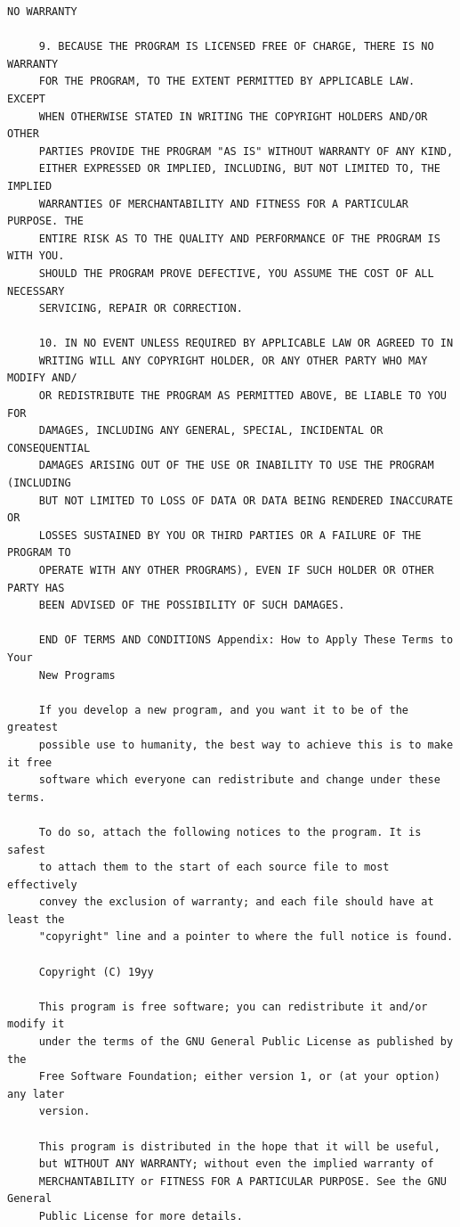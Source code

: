 \begin{lstlisting}[basicstyle=\ttfamily\footnotesize,breaklines=true]
     NO WARRANTY

     9. BECAUSE THE PROGRAM IS LICENSED FREE OF CHARGE, THERE IS NO WARRANTY
     FOR THE PROGRAM, TO THE EXTENT PERMITTED BY APPLICABLE LAW. EXCEPT
     WHEN OTHERWISE STATED IN WRITING THE COPYRIGHT HOLDERS AND/OR OTHER
     PARTIES PROVIDE THE PROGRAM "AS IS" WITHOUT WARRANTY OF ANY KIND,
     EITHER EXPRESSED OR IMPLIED, INCLUDING, BUT NOT LIMITED TO, THE IMPLIED
     WARRANTIES OF MERCHANTABILITY AND FITNESS FOR A PARTICULAR PURPOSE. THE
     ENTIRE RISK AS TO THE QUALITY AND PERFORMANCE OF THE PROGRAM IS WITH YOU.
     SHOULD THE PROGRAM PROVE DEFECTIVE, YOU ASSUME THE COST OF ALL NECESSARY
     SERVICING, REPAIR OR CORRECTION.

     10. IN NO EVENT UNLESS REQUIRED BY APPLICABLE LAW OR AGREED TO IN
     WRITING WILL ANY COPYRIGHT HOLDER, OR ANY OTHER PARTY WHO MAY MODIFY AND/
     OR REDISTRIBUTE THE PROGRAM AS PERMITTED ABOVE, BE LIABLE TO YOU FOR
     DAMAGES, INCLUDING ANY GENERAL, SPECIAL, INCIDENTAL OR CONSEQUENTIAL
     DAMAGES ARISING OUT OF THE USE OR INABILITY TO USE THE PROGRAM (INCLUDING
     BUT NOT LIMITED TO LOSS OF DATA OR DATA BEING RENDERED INACCURATE OR
     LOSSES SUSTAINED BY YOU OR THIRD PARTIES OR A FAILURE OF THE PROGRAM TO
     OPERATE WITH ANY OTHER PROGRAMS), EVEN IF SUCH HOLDER OR OTHER PARTY HAS
     BEEN ADVISED OF THE POSSIBILITY OF SUCH DAMAGES.

     END OF TERMS AND CONDITIONS Appendix: How to Apply These Terms to Your
     New Programs

     If you develop a new program, and you want it to be of the greatest
     possible use to humanity, the best way to achieve this is to make it free
     software which everyone can redistribute and change under these terms.

     To do so, attach the following notices to the program. It is safest
     to attach them to the start of each source file to most effectively
     convey the exclusion of warranty; and each file should have at least the
     "copyright" line and a pointer to where the full notice is found.

     Copyright (C) 19yy

     This program is free software; you can redistribute it and/or modify it
     under the terms of the GNU General Public License as published by the
     Free Software Foundation; either version 1, or (at your option) any later
     version.

     This program is distributed in the hope that it will be useful,
     but WITHOUT ANY WARRANTY; without even the implied warranty of
     MERCHANTABILITY or FITNESS FOR A PARTICULAR PURPOSE. See the GNU General
     Public License for more details.





\end{lstlisting}
